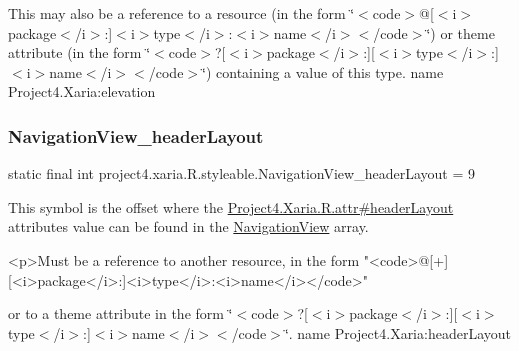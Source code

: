 This may also be a reference to a resource (in the form \char`\"{}$<$code$>$@\mbox{[}$<$i$>$package$<$/i$>$\+:\mbox{]}$<$i$>$type$<$/i$>$\+:$<$i$>$name$<$/i$>$$<$/code$>$\char`\"{}) or theme attribute (in the form \char`\"{}$<$code$>$?\mbox{[}$<$i$>$package$<$/i$>$\+:\mbox{]}\mbox{[}$<$i$>$type$<$/i$>$\+:\mbox{]}$<$i$>$name$<$/i$>$$<$/code$>$\char`\"{}) containing a value of this type.  name Project4.\+Xaria\+:elevation \mbox{\label{classproject4_1_1xaria_1_1R_1_1styleable_aba1cb9b91f8ee6dffd022b886c737544}} 
\subsubsection{\texorpdfstring{Navigation\+View\+\_\+header\+Layout}{NavigationView\_headerLayout}}
{\footnotesize\ttfamily static final int project4.\+xaria.\+R.\+styleable.\+Navigation\+View\+\_\+header\+Layout = 9\hspace{0.3cm}{\ttfamily [static]}}

This symbol is the offset where the \hyperlink{}{Project4.\+Xaria.\+R.\+attr\#header\+Layout} attribute\textquotesingle{}s value can be found in the \hyperlink{classproject4_1_1xaria_1_1R_1_1styleable_a93b7138d1a19f728c4d3933a75ce23e2}{Navigation\+View} array.

\begin{DoxyVerb}      <p>Must be a reference to another resource, in the form "<code>@[+][<i>package</i>:]<i>type</i>:<i>name</i></code>"
\end{DoxyVerb}
 or to a theme attribute in the form \char`\"{}$<$code$>$?\mbox{[}$<$i$>$package$<$/i$>$\+:\mbox{]}\mbox{[}$<$i$>$type$<$/i$>$\+:\mbox{]}$<$i$>$name$<$/i$>$$<$/code$>$\char`\"{}.  name Project4.\+Xaria\+:header\+Layout \mbox{\label{classproject4_1_1xaria_1_1R_1_1styleable_a55510ee8cd624d814f16034b63474168}} 
